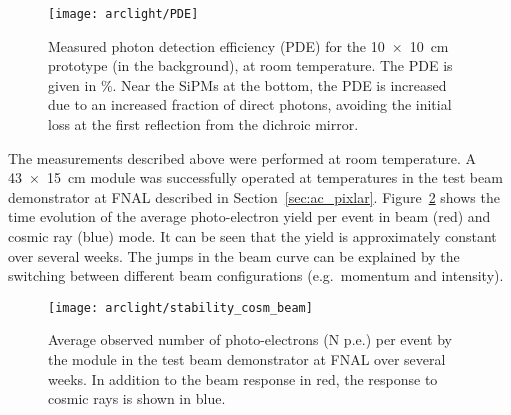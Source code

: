 \begin{figure}[htb]
	\centering
	\texttt{[image: arclight/PDE]}
	\caption{Measured photon detection efficiency (PDE) for the \SI{10 x 10}{\centi\metre} \AL{} prototype (in the background), at room temperature.
		The PDE is given in \si{\percent}.
		Near the SiPMs at the bottom, the PDE is increased due to an increased fraction of direct photons, avoiding the initial loss at the first reflection from the dichroic mirror.}
	\label{fig:arclight_pde}
\end{figure}

The measurements described above were performed at room temperature.
A \SI{43 x 15}{\centi\metre} \AL{} module was successfully operated at \lar{} temperatures in the \pixlar{} test beam demonstrator at FNAL described in Section~\ref{sec:ac_pixlar}.
Figure~\ref{fig:arclight_pixlar} shows the time evolution of the average photo-electron yield per event in beam (red) and cosmic ray (blue) mode.
It can be seen that the yield is approximately constant over several weeks.
The jumps in the beam curve can be explained by the switching between different beam configurations (e.g.\ momentum and intensity).


\begin{figure}[htb]
	\centering
	\texttt{[image: arclight/stability\_cosm\_beam]}
	\caption{Average observed number of photo-electrons (N p.e.) per event by the \AL{} module in the \pixlar{} test beam demonstrator at FNAL over several weeks.
		In addition to the beam response in red, the response to cosmic rays is shown in blue.}
	\label{fig:arclight_pixlar}
\end{figure}

\afterpage{\clearpage}